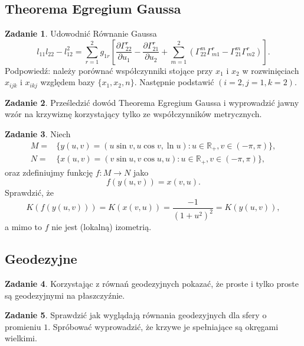\documentclass[a4paper,11pt]{article}
\theoremstyle{definition}\newtheorem{exercise}{Zadanie}
\theoremstyle{definition}\newtheorem{remark}{Uwaga}
\begin{document}
\subsection{Theorema Egregium Gaussa}

\begin{exercise}
 Udowodnić R\'ownanie Gaussa
 \begin{equation*}
l_{11}l_{22}-l_{12}^2=
\sum_{r=1}^{2}g_{1r}
\left[
\frac{\partial \Gamma^r_{22}} {\partial u_{1}}- \frac{\partial\Gamma 
^r_{21}}{\partial u_{2}}+
\sum_{m=1}^2 
\left(\Gamma^m_{22}\Gamma^r_{m1}-\Gamma^m_{21}\Gamma^r_{m2}\right)\right].
\end{equation*}
\footnotesize{Podpowiedź: należy porównać współczynniki stojące przy $x_1$ i 
$x_2$ w rozwinięciach $x_{ijk} $ i $x_{ikj} $ względem bazy 
$\{x_1,x_2,n\}$. Następnie podstawić $(i=2,j=1,k=2)$.}

\end{exercise}

\begin{exercise}
 Prześledzić dow\'od Theorema Egregium Gaussa i wyprowadzić jawny wz\'or na 
krzywiznę korzystający tylko ze wsp\'ołczynnik\'ow metrycznych.
\end{exercise}

\begin{exercise}
Niech 
\begin{align*}
M=&\{y(u,v)=(u \sin v, u\cos v,\ln u)\colon u\in \mathbb{R}_+, v\in 
(-\pi,\pi)\},\\
N=&\{x(u,v)=(v \sin u, v\cos u, u)\colon u\in \mathbb{R}_+, v\in (-\pi,\pi)\},
\end{align*}
oraz zdefiniujmy funkcję $f\colon M\to N$ jako \[f(y(u,v))= x(v,u).\]
Sprawdzić, że 
\[K\left( f(y(u,v))\right)=K(x(v,u))=\frac{-1}{(1+u^2)^2}=K(y(u,v)),\]
a mimo to $f$ nie jest (lokalną) izometrią.
\end{exercise}

\subsection{Geodezyjne}

\begin{exercise}
 Korzystając z r\'ownań geodezyjnych pokazać, że proste i tylko proste są 
geodezyjnymi na płaszczyźnie.
\end{exercise}

\begin{exercise}
 Sprawdzić jak wyglądają r\'ownania geodezyjnych dla sfery o promieniu $1$. 
Spr\'obować wyprowadzić, że krzywe je spełniające są okręgami wielkimi.
\end{exercise}
\end{document}
